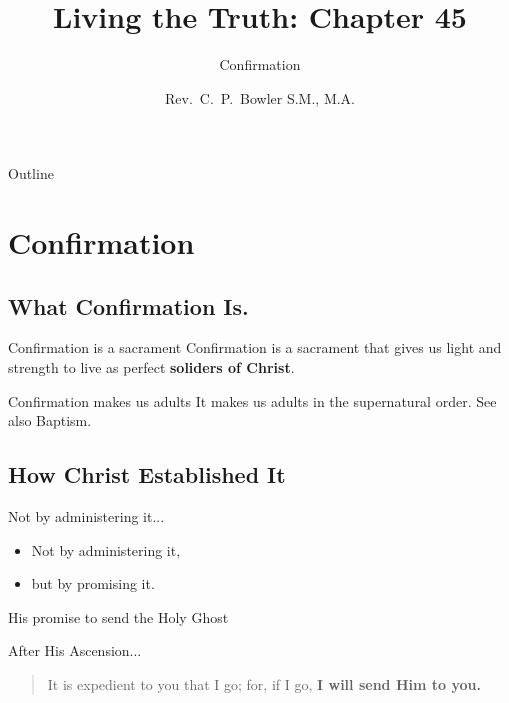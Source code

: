 \documentclass{beamer}
\title[Living the Truth 45] %
{Living the Truth: Chapter 45}
\subtitle
{Confirmation} %
\author{Rev.~C.~P.~Bowler S.M., M.A.}
\begin{document}
\begin{frame}
  \titlepage
\end{frame}

\begin{frame}{Outline}
  \tableofcontents
\end{frame}




\section{Confirmation}

\subsection{What Confirmation Is.}

\begin{frame}{Confirmation is a sacrament}
Confirmation is a sacrament that gives us light and strength to live as perfect \textbf{soliders of Christ}.
\end{frame}

\begin{frame}{Confirmation makes us adults}
It makes us adults in the supernatural order. See also Baptism.
\end{frame}

\subsection{How Christ Established It}

\begin{frame}{Not by administering it...}
\begin{itemize}
\item
Not by administering it,
\item
but by promising it.
\end{itemize}
\end{frame}

\begin{frame}{His promise to send the Holy Ghost}

After His Ascension...

\begin{quote}
It is expedient to you that I go; for, if I go, \textbf{I will send Him to you.}
\end{quote}

\end{frame}
\end{document}
